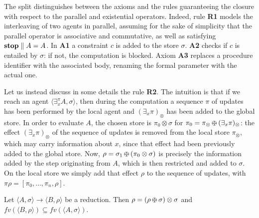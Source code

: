 \documentclass{llncs}
\newcommand{\ostop}{{\bf stop}}
\newcommand{\rarrow}{\rightarrow}
\def\odiv{\, {\ominus\hspace{-7.7pt} \div} \,}
\begin{document}
The split distinguishes between the axioms and the rules guaranteeing the closure with respect to the parallel and existential operators. Indeed, rule {\bf  R1} models the interleaving of two agents in parallel, assuming for the sake of simplicity
that the parallel operator is associative and commutative, as well as satisfying $ \hbox{\ostop} \parallel A = A$.
%
%
In {\bf A1} a constraint $c$ is added to the store $\sigma$.
%
{\bf A2} checks if $c$ is entailed by  $\sigma$: if not, the computation is blocked.
%
Axiom {\bf A3} replaces a procedure identifier with the associated body, renaming the formal parameter with the actual one.
%

Let us instead discuss in some details the rule {\bf R2}.
The intuition is that if we reach an agent $\langle \exists^{\pi}_x A,\sigma\rangle$, then during the computation
a sequence $\pi$ of updates has been performed by the local agent and $(\exists_x \pi)_\otimes$ 
has been added to the global store. In order to evaluate $A$, the chosen 
store is 
$\pi_0 \otimes \sigma$ for $\pi_0 = \pi_\otimes \odiv (\exists_x \pi)_\otimes$: the
effect $(\exists_x \pi)_\otimes$ of the sequence of updates is removed from the local store $\pi_\otimes$,
which may carry information about $x$, since that effect had been previously added to the global store.
%
Now, $\rho = \sigma_1 \odiv (\pi_0 \otimes \sigma)$ 
is precisely the information added by the step originating from $A$, which is then restricted and added to $\sigma$. 
On the local store we simply add that effect $\rho$ to the sequence of updates, with
$\pi \rho = [\pi_0, \ldots, \pi_n, \rho]$.

\begin{lemma}[On monotonicity]
\label{rmono}
Let $\langle A, \sigma \rangle \rightarrow \langle B, \rho \rangle$ be a reduction. 
Then $\rho = (\rho \odiv \sigma) \otimes \sigma$ and $fv(\langle B, \rho \rangle) \subseteq fv(\langle A, \sigma \rangle)$.
\end{lemma}
 
\end{document}
